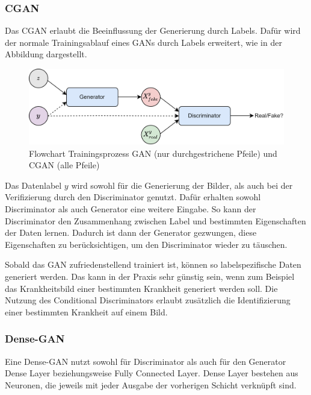 \subsubsection{CGAN}
Das \acrfull{CGAN} \cite{mirza2014conditional, gan-conditional} erlaubt die Beeinflussung der Generierung durch Labels.
Dafür wird der normale Trainingsablauf eines GANs durch Labels erweitert, wie in der Abbildung dargestellt.
\begin{figure}[H]
	\centering
	\includegraphics[width=14cm]{kapitel/2_stand_der_technik/img/cgan-vs-gan.drawio.png}
	\caption[Flowchart Trainingsprozess GAN und CGAN]{Flowchart Trainingsprozess GAN (nur durchgestrichene Pfeile) und CGAN (alle Pfeile)}
	\label{flowchart-cgan-vs-gan}
\end{figure}

Das Datenlabel $y$ wird sowohl für die Generierung der Bilder, als auch bei der Verifizierung durch den Discriminator genutzt.
Dafür erhalten sowohl Discriminator als auch Generator eine weitere Eingabe.
So kann der Discriminator den Zusammenhang zwischen Label und bestimmten Eigenschaften der Daten lernen.
Dadurch ist dann der Generator gezwungen, diese Eigenschaften zu berücksichtigen, um den Discriminator wieder zu täuschen.
\newline

Sobald das \acrshort{GAN} zufriedenstellend trainiert ist, können so labelspezifische Daten generiert werden.
Das kann in der Praxis sehr günstig sein, wenn zum Beispiel das Krankheitsbild einer bestimmten Krankheit generiert werden soll.
Die Nutzung des Conditional Discriminators erlaubt zusätzlich die Identifizierung einer bestimmten Krankheit auf einem Bild.

\subsubsection{Dense-GAN}
Eine Dense-GAN nutzt sowohl für Discriminator als auch für den Generator Dense Layer beziehungsweise Fully Connected Layer.
Dense Layer bestehen aus Neuronen, die jeweils mit jeder Ausgabe der vorherigen Schicht verknüpft sind.
\newline


